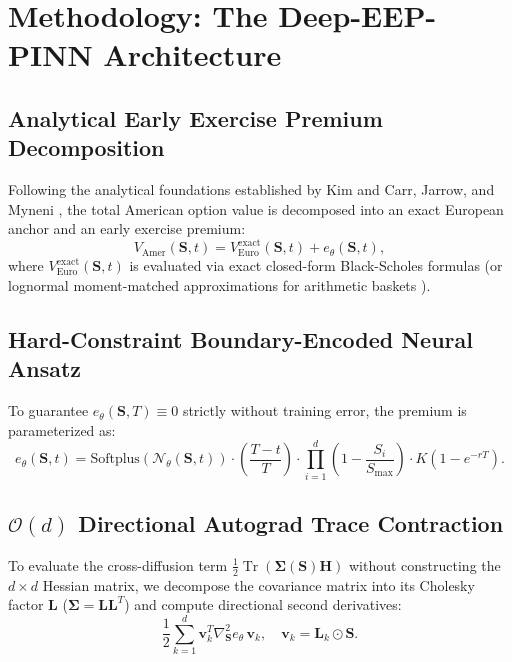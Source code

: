 \documentclass[11pt,a4paper]{article}
\begin{document}
\section{Methodology: The Deep-EEP-PINN Architecture}

\subsection{Analytical Early Exercise Premium Decomposition}
Following the analytical foundations established by Kim \cite{kim1990analytic} and Carr, Jarrow, and Myneni \cite{carr1992alternative}, the total American option value is decomposed into an exact European anchor and an early exercise premium:
\begin{equation}
V_{\text{Amer}}(\mathbf{S}, t) = V_{\text{Euro}}^{\text{exact}}(\mathbf{S}, t) + e_\theta(\mathbf{S}, t),
\end{equation}
where $V_{\text{Euro}}^{\text{exact}}(\mathbf{S}, t)$ is evaluated via exact closed-form Black-Scholes formulas (or lognormal moment-matched approximations for arithmetic baskets \cite{milevsky1998valuing, gentle1993basket}).

\subsection{Hard-Constraint Boundary-Encoded Neural Ansatz}
To guarantee $e_\theta(\mathbf{S}, T) \equiv 0$ strictly without training error, the premium is parameterized as:
\begin{equation}
e_\theta(\mathbf{S}, t) = \text{Softplus}\left(\mathcal{N}_\theta(\mathbf{S}, t)\right) \cdot \left(\frac{T-t}{T}\right) \cdot \prod_{i=1}^d \left(1 - \frac{S_i}{S_{\max}}\right) \cdot K\left(1 - e^{-rT}\right).
\end{equation}

\subsection{$\mathcal{O}(d)$ Directional Autograd Trace Contraction}
To evaluate the cross-diffusion term $\frac{1}{2} \operatorname{Tr}\left( \boldsymbol{\Sigma}(\mathbf{S}) \mathbf{H} \right)$ without constructing the $d \times d$ Hessian matrix, we decompose the covariance matrix into its Cholesky factor $\mathbf{L}$ ($\boldsymbol{\Sigma} = \mathbf{L} \mathbf{L}^T$) and compute directional second derivatives:
\begin{equation}
\frac{1}{2} \sum_{k=1}^d \mathbf{v}_k^T \nabla^2_{\mathbf{S}} e_\theta \, \mathbf{v}_k, \quad \mathbf{v}_k = \mathbf{L}_k \odot \mathbf{S}.
\end{equation}
\end{document}
